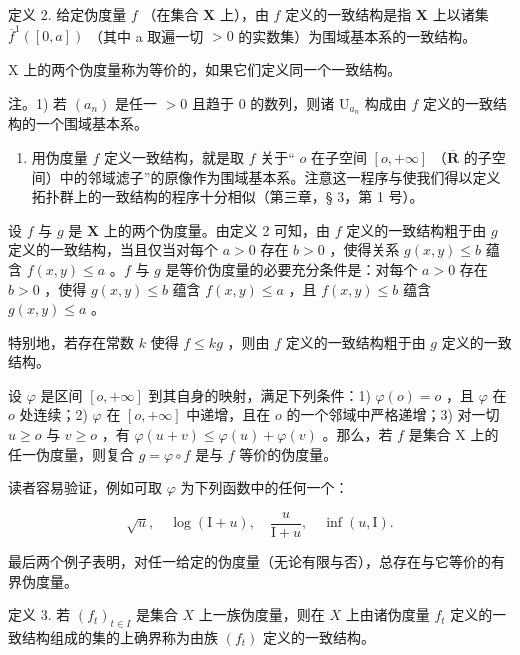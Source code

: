 定义 2. 给定伪度量 \(f\) （在集合 \(\mathbf{X}\) 上），由 \(f\) 定义的一致结构是指 \(\mathbf{X}\) 上以诸集 \(\overline{f}^{1}([0, a])\) （其中 a 取遍一切 \(> 0\) 的实数集）为围域基本系的一致结构。

X 上的两个伪度量称为等价的，如果它们定义同一个一致结构。

注。1) 若 \((a_{n})\) 是任一 \(>0\) 且趋于 \(0\) 的数列，则诸 \(\mathrm{U}_{a_n}\) 构成由 \(f\) 定义的一致结构的一个围域基本系。

\begin{enumerate}
\def\labelenumi{\arabic{enumi})}
\setcounter{enumi}{1}
\tightlist
\item
  用伪度量 \(f\) 定义一致结构，就是取 \(f\) 关于“ \(o\) 在子空间 \([o, +\infty]\) （\(\overline{\mathbf{R}}\) 的子空间）中的邻域滤子”的原像作为围域基本系。注意这一程序与使我们得以定义拓扑群上的一致结构的程序十分相似（第三章，§ 3，第 1 号）。
\end{enumerate}

设 \(f\) 与 \(g\) 是 \(\mathbf{X}\) 上的两个伪度量。由定义 2 可知，由 \(f\) 定义的一致结构粗于由 \(g\) 定义的一致结构，当且仅当对每个 \(a > 0\) 存在 \(b > 0\) ，使得关系 \(g(x, y) \leqslant b\) 蕴含 \(f(x, y) \leqslant a\) 。\(f\) 与 \(g\) 是等价伪度量的必要充分条件是：对每个 \(a > 0\) 存在 \(b > 0\) ，使得 \(g(x, y) \leqslant b\) 蕴含 \(f(x, y) \leqslant a\) ，且 \(f(x, y) \leqslant b\) 蕴含 \(g(x, y) \leqslant a\) 。

特别地，若存在常数 \(k\) 使得 \(f \leqslant kg\) ，则由 \(f\) 定义的一致结构粗于由 \(g\) 定义的一致结构。

设 \(\varphi\) 是区间 \([o, +\infty]\) 到其自身的映射，满足下列条件：1) \(\varphi(o) = o\) ，且 \(\varphi\) 在 \(o\) 处连续；2) \(\varphi\) 在 \([o, +\infty]\) 中递增，且在 \(o\) 的一个邻域中严格递增；3) 对一切 \(u \geqslant o\) 与 \(v \geqslant o\) ，有 \(\varphi(u + v) \leqslant \varphi(u) + \varphi(v)\) 。那么，若 \(f\) 是集合 X 上的任一伪度量，则复合 \(g = \varphi \circ f\) 是与 \(f\) 等价的伪度量。

读者容易验证，例如可取 \(\varphi\) 为下列函数中的任何一个：

\[
\sqrt {u}, \quad \log (\mathrm{I} + u), \quad \frac {u}{\mathrm{I} + u}, \quad \inf (u, \mathrm{I}).
\]

最后两个例子表明，对任一给定的伪度量（无论有限与否），总存在与它等价的有界伪度量。

定义 3. 若 \((f_{t})_{t\in I}\) 是集合 \(X\) 上一族伪度量，则在 \(X\) 上由诸伪度量 \(f_{t}\) 定义的一致结构组成的集的上确界称为由族 \((f_{t})\) 定义的一致结构。

